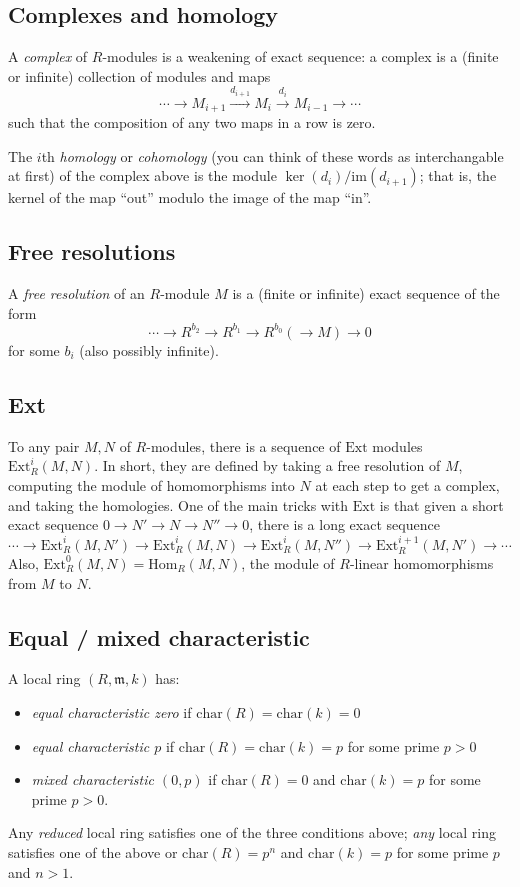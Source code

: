 \documentclass[12pt]{amsart}
\newcommand{\m}{\mathfrak{m}}
\begin{document}
\subsection*{Complexes and homology} A \emph{complex} of $R$-modules is a weakening of exact sequence: a complex is a (finite or infinite) collection of modules and maps
\[ \cdots  \rightarrow M_{i+1} \xrightarrow{d_{i+1}} M_{i} \xrightarrow{d_{i}} M_{i-1} \rightarrow \cdots\]
such that the composition of any two maps in a row is zero.

The $i$th \emph{homology} or \emph{cohomology} (you can think of these words as interchangable at first) of the complex above is the module $\ker(d_i)/\mathrm{im}(d_{i+1})$; that is, the kernel of the map ``out'' modulo the image of the map ``in''.

\subsection*{Free resolutions} A \emph{free resolution} of an $R$-module $M$ is a (finite or infinite) exact sequence of the form
\[ \cdots\to  R^{b_2} \rightarrow R^{b_1} \rightarrow R^{b_0}(  \rightarrow M) \to 0\]
for some $b_i$ (also possibly infinite). 



\subsection*{Ext} To any pair $M,N$ of $R$-modules, there is a sequence of $\mathrm{Ext}$ modules $\mathrm{Ext}^i_R(M,N)$. In short, they are defined by taking a free resolution of $M$, computing the module of homomorphisms into $N$ at each step to get a complex, and taking the homologies. One of the main tricks with $\mathrm{Ext}$ is that given a short exact sequence $0\to N' \to N \to N'' \to 0$, there is a long exact sequence
\[ \cdots \to \mathrm{Ext}^i_R(M,N') \to \mathrm{Ext}^i_R(M,N) \to \mathrm{Ext}^i_R(M,N'') \to \mathrm{Ext}^{i+1}_R(M,N') \to \cdots\]
Also, $\mathrm{Ext}^0_R(M,N)=\mathrm{Hom}_R(M,N)$, the module of $R$-linear homomorphisms from $M$ to $N$.


\subsection*{Equal / mixed characteristic} A local ring $(R,\m,k)$ has:
\begin{itemize}
\item \textit{equal characteristic zero} if $\mathrm{char}(R)=\mathrm{char}(k)=0$
\item \textit{equal characteristic $p$} if $\mathrm{char}(R)=\mathrm{char}(k)=p$ for some prime $p>0$
\item \textit{mixed characteristic $(0,p)$} if $\mathrm{char}(R)=0$ and $\mathrm{char}(k)=p$ for some prime $p>0$.
\end{itemize}
Any \emph{reduced} local ring satisfies one of the three conditions above; \emph{any} local ring satisfies one of the above or $\mathrm{char}(R)=p^n$ and $\mathrm{char}(k)=p$ for some prime $p$ and $n>1$.
\end{document}

